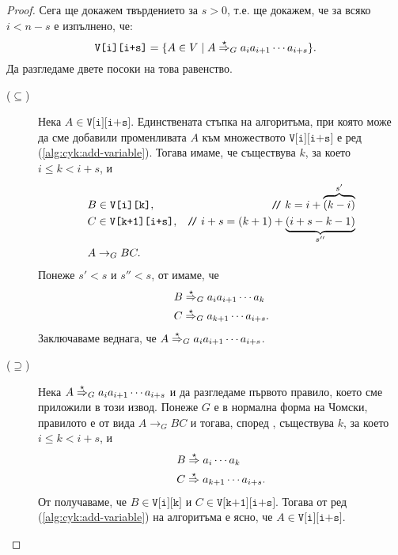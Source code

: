 \begin{proof}
  Сега ще докажем твърдението за $s > 0$, т.е. ще докажем, че за всяко $i < n-s$ е изпълнено, че:
  \[\texttt{V[i][i+s]} = \{A \in V \mid A \stackrel{{\star}}{\Rightarrow}_G a_ia_{i+1}\cdots a_{i+s}\}.\]
  Да разгледаме двете посоки на това равенство.
  \begin{description}
  \item[($\subseteq$)]
    Нека $A \in \texttt{V[i][i+s]}$.
    Единствената стъпка на алгоритъма, при която може да сме добавили променливата $A$ към множеството $\texttt{V[i][i+s]}$ е ред (\ref{alg:cyk:add-variable}).
    Тогава имаме, че съществува $k$, за което $i \leq k < i+s$, и 
    \begin{align*}
      & B \in \texttt{V[i][k]}, & \texttt{/}\!\texttt{/}\  k = i + \overbrace{(k - i)}^{s'}\\
      & C \in \texttt{V[k+1][i+s]}, & \texttt{/}\!\texttt{/}\  i + s = (k+1)+\underbrace{(i+s-k-1)}_{s''}\\
      & A\to_G BC.
    \end{align*}
    Понеже $s' < s$ и $s'' < s$, от \IndHyp имаме, че
    \begin{align*}
      & B \stackrel{{\star}}{\Rightarrow}_G a_ia_{i+1}\cdots a_k \\
      & C \stackrel{{\star}}{\Rightarrow}_G a_{k+1}\cdots a_{i+s}. 
    \end{align*}
    Заключаваме веднага, че $A \stackrel{{\star}}{\Rightarrow}_G a_ia_{i+1}\cdots a_{i+s}$.
  \item[($\supseteq$)]
    Нека $A \stackrel{{\star}}{\Rightarrow}_G a_ia_{i+1}\cdots a_{i+s}$ и да разгледаме първото правило, което сме приложили в този извод.
    Понеже $G$ е в нормална форма на Чомски, правилото е от вида $A \to_G BC$ и тогава, според , съществува $k$, за което $i \leq k < i+s$, и
    \begin{align*}
      & B \stackrel{{\star}}{\Rightarrow} a_{i}\cdots a_{k} \\
      & C \stackrel{{\star}}{\Rightarrow} a_{k+1}\cdots a_{i+s}.
    \end{align*}
    От \IndHyp получаваме, че $B \in \texttt{V[i][k]}$ и $C \in \texttt{V[k+1][i+s]}$.
    Тогава от ред (\ref{alg:cyk:add-variable}) на алгоритъма е ясно, че $A \in \texttt{V[i][i+s]}$.
  \end{description}
\end{proof}


